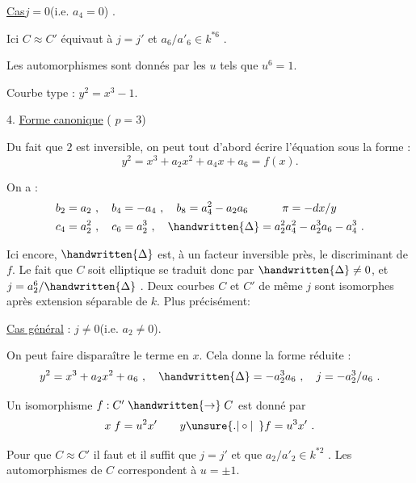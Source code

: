 
\uline{Cas}\quad $j=0$\quad (i.e. $a_{4}=0$) .

Ici $C\approx C'$ équivaut à $j=j'$ et $a_{6}/a'_{6}\in k^{\ast 6}$ .

Les automorphismes sont donnés par les $u$ tels que $u^{6}=1$.

Courbe type : $y^{2}=x^{3}-1$.

4. \uline{Forme canonique} ( $p=3$)

Du fait que $2$ est inversible, on peut tout d'abord écrire l'équation sous la forme :
\[
 y^{2}=x^{3}+a_{2}x^{2}+a_{4}x+a_{6}=f(x).
\]

On a :
\[
\begin{aligned}
 &b_{2}=a_{2}\ ,\quad b_{4}=-a_{4}\ ,\quad b_{8}=a_{4}^{2}-a_{2}a_{6}
 \qquad\quad \pi=-dx/y\\
 &c_{4}=a_{2}^{2}\ ,\quad c_{6}=a_{2}^{3}\ ,\quad
 \handwritten{\Delta}=a_{2}^{2}a_{4}^{2}-a_{2}^{3}a_{6}-a_{4}^{3}\ .
\end{aligned}
\]

Ici encore, $\handwritten{\Delta}$ est, à un facteur inversible près, le discriminant de $f$. Le fait que $C$ soit elliptique se traduit donc par $\handwritten{\Delta}\ne 0$, et $j=a_{2}^{6}/\handwritten{\Delta}$ . Deux courbes $C$ et $C'$ de même $j$ sont isomorphes après extension séparable de $k$. Plus précisément:

\uline{Cas général} : $j\ne 0$\quad (i.e. $a_{2}\ne 0$).

On peut faire disparaître le terme en $x$. Cela donne la forme réduite :
\[
 y^{2}=x^{3}+a_{2}x^{2}+a_{6}\ ,\quad
 \handwritten{\Delta}=-a_{2}^{3}a_{6}\ ,\quad j=-a_{2}^{3}/a_{6}\ .
\]

Un isomorphisme $f:C'\mathrel{\handwritten{\to}}C$ est donné par
\[
 x\;f=u^{2}x'\qquad y\unsure{\mathord{.}|\circ|\phantom{\circ}}f=u^{3}x'\ .
\]

Pour que $C\approx C'$ il faut et il suffit que $j=j'$ et que $a_{2}/a'_{2}\in k^{\ast 2}$ . Les automorphismes de $C$ correspondent à $u=\pm 1$.

